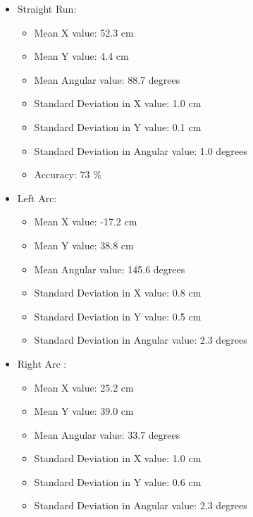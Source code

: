 \documentclass[10pt,a4paper]{article}
\begin{document}
	\begin{itemize}
		\item Straight Run:		
			\begin{itemize}
				\item Mean X value: 52.3 cm
				\item Mean Y value: 4.4 cm
				\item Mean Angular value: 88.7 degrees
				\item Standard Deviation in X value: 1.0 cm
				\item Standard Deviation in Y value: 0.1 cm
				\item Standard Deviation in Angular value: 1.0 degrees
				\item Accuracy: 73 \%
			\end{itemize}
		\item Left Arc:
			\begin{itemize}
				\item Mean X value: -17.2 cm
				\item Mean Y value: 38.8 cm
				\item Mean Angular value: 145.6 degrees
				\item Standard Deviation in X value: 0.8 cm
				\item Standard Deviation in Y value: 0.5 cm
				\item Standard Deviation in Angular value: 2.3 degrees
			\end{itemize}
		\item Right Arc	:
			\begin{itemize}
				\item Mean X value: 25.2 cm
				\item Mean Y value: 39.0 cm
				\item Mean Angular value: 33.7 degrees
				\item Standard Deviation in X value: 1.0 cm
				\item Standard Deviation in Y value: 0.6 cm
				\item Standard Deviation in Angular value: 2.3 degrees
			\end{itemize}	
	\end{itemize}
	
	
	
\end{document}
